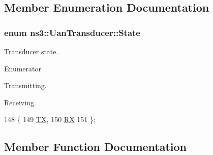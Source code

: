 \subsection{Member Enumeration Documentation}
\subsubsection[{\texorpdfstring{State}{State}}]{\setlength{\rightskip}{0pt plus 5cm}enum {\bf ns3\+::\+Uan\+Transducer\+::\+State}}\hypertarget{classns3_1_1UanTransducer_a037314c27ca07c9c6234460086058bce}{}\label{classns3_1_1UanTransducer_a037314c27ca07c9c6234460086058bce}
Transducer state. \begin{Desc}
\item[Enumerator]\par
\begin{description}
\item[{\em 
TX\hypertarget{classns3_1_1UanTransducer_a037314c27ca07c9c6234460086058bceaebb4d4341dddeff74e7a91632d6b5f4d}{}\label{classns3_1_1UanTransducer_a037314c27ca07c9c6234460086058bceaebb4d4341dddeff74e7a91632d6b5f4d}
}]Transmitting. \item[{\em 
RX\hypertarget{classns3_1_1UanTransducer_a037314c27ca07c9c6234460086058bcea7f900390ec167f157963a7147db7ab2b}{}\label{classns3_1_1UanTransducer_a037314c27ca07c9c6234460086058bcea7f900390ec167f157963a7147db7ab2b}
}]Receiving. \end{description}
\end{Desc}

\begin{DoxyCode}
148              \{
149     \hyperlink{classns3_1_1UanTransducer_a037314c27ca07c9c6234460086058bceaebb4d4341dddeff74e7a91632d6b5f4d}{TX},  
150     \hyperlink{classns3_1_1UanTransducer_a037314c27ca07c9c6234460086058bcea7f900390ec167f157963a7147db7ab2b}{RX}   
151   \};
\end{DoxyCode}


\subsection{Member Function Documentation}
